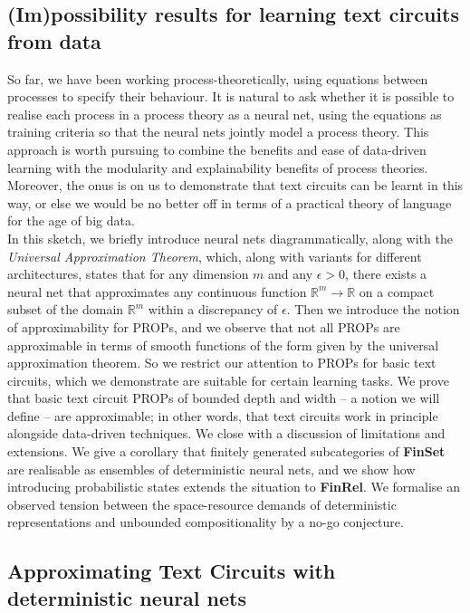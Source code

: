 \begin{fullwidth}

\section{(Im)possibility results for learning text circuits from data}

So far, we have been working process-theoretically, using equations between processes to specify their behaviour. It is natural to ask whether it is possible to realise each process in a process theory as a neural net, using the equations as training criteria so that the neural nets jointly model a process theory. This approach is worth pursuing to combine the benefits and ease of data-driven learning with the modularity and explainability benefits of process theories. Moreover, the onus is on us to demonstrate that text circuits can be learnt in this way, or else we would be no better off in terms of a practical theory of language for the age of big data.\\

In this sketch, we briefly introduce neural nets diagrammatically, along with the \emph{Universal Approximation Theorem}, which, along with variants for different architectures, states that for any dimension $m$ and any $\epsilon > 0$, there exists a neural net that approximates any continuous function $\mathbb{R}^m \rightarrow \mathbb{R}$ on a compact subset of the domain $\mathbb{R}^m$ within a discrepancy of $\epsilon$. Then we introduce the notion of approximability for PROPs, and we observe that not all PROPs are approximable in terms of smooth functions of the form given by the universal approximation theorem. So we restrict our attention to PROPs for basic text circuits, which we demonstrate are suitable for certain learning tasks. We prove that basic text circuit PROPs of bounded depth and width -- a notion we will define -- are approximable; in other words, that text circuits work in principle alongside data-driven techniques. We close with a discussion of limitations and extensions. We give a corollary that finitely generated subcategories of \textbf{FinSet} are realisable as ensembles of deterministic neural nets, and we show how introducing probabilistic states extends the situation to \textbf{FinRel}. We formalise an observed tension between the space-resource demands of deterministic representations and unbounded compositionality by a no-go conjecture.

\subsection{Approximating Text Circuits with deterministic neural nets}


\end{fullwidth}
